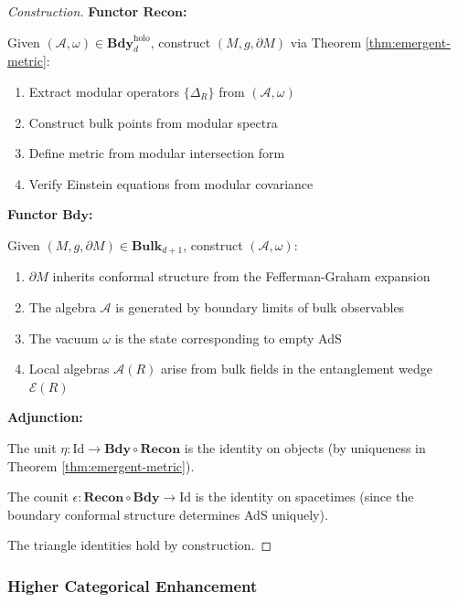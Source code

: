 \documentclass[12pt,a4paper]{article}
\begin{document}
\begin{proof}[Construction]
\textbf{Functor $\mathbf{Recon}$:}

Given $(\mathcal{A}, \omega) \in \mathbf{Bdy}_d^{\text{holo}}$, construct $(M, g, \partial M)$ via Theorem \ref{thm:emergent-metric}:
\begin{enumerate}
    \item Extract modular operators $\{\Delta_R\}$ from $(\mathcal{A}, \omega)$
    \item Construct bulk points from modular spectra
    \item Define metric from modular intersection form
    \item Verify Einstein equations from modular covariance
\end{enumerate}

\textbf{Functor $\mathbf{Bdy}$:}

Given $(M, g, \partial M) \in \mathbf{Bulk}_{d+1}$, construct $(\mathcal{A}, \omega)$:
\begin{enumerate}
    \item $\partial M$ inherits conformal structure from the Fefferman-Graham expansion
    \item The algebra $\mathcal{A}$ is generated by boundary limits of bulk observables
    \item The vacuum $\omega$ is the state corresponding to empty AdS
    \item Local algebras $\mathcal{A}(R)$ arise from bulk fields in the entanglement wedge $\mathcal{E}(R)$
\end{enumerate}

\textbf{Adjunction:}

The unit $\eta: \text{Id} \to \mathbf{Bdy} \circ \mathbf{Recon}$ is the identity on objects (by uniqueness in Theorem \ref{thm:emergent-metric}).

The counit $\epsilon: \mathbf{Recon} \circ \mathbf{Bdy} \to \text{Id}$ is the identity on spacetimes (since the boundary conformal structure determines AdS uniquely).

The triangle identities hold by construction.
\end{proof}

\subsubsection{Higher Categorical Enhancement}
\end{document}
